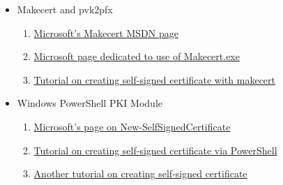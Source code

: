 \documentclass[10pt, a4paper]{report}
\begin{document}
\begin{itemize}
\begin{enumerate}
  \end{enumerate}
 \item{Makecert and pvk2pfx}
  \begin{enumerate}
   \item \href{https://msdn.microsoft.com/en-us/library/windows/desktop/aa386968(v=vs.85).aspx}{Microsoft's Makecert MSDN page}
   \item \href{https://msdn.microsoft.com/en-us/library/bfsktky3(VS.100).aspx}{Microsoft page dedicated to use of Makecert.exe}
   \item \href{https://blog.jayway.com/2014/09/03/creating-self-signed-certificates-with-makecert-exe-for-development/}{Tutorial on creating self-signed certificate with makecert}
  \end{enumerate}
 \item{Windows PowerShell PKI Module}
  \begin{enumerate}
   \item \href{https://technet.microsoft.com/en-us/library/hh848633.aspx}{Microsoft's page on New-SelfSignedCertificate}
   \item \href{http://windowsitpro.com/blog/creating-self-signed-certificates-powershell}{Tutorial on creating self-signed certificate via PowerShell}
   \item \href{http://woshub.com/how-to-create-self-signed-certificate-with-powershell/}{Another tutorial on creating self-signed certificate}
  \end{enumerate}

\end{itemize}
\end{document}
